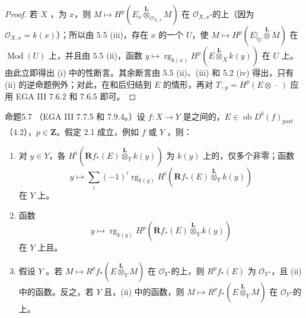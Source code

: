\begin{proof}
若 $X$ ，为 $x$，则 $M\mapsto H^p(E_x\mathbin{\overset{\mathbf L}{\otimes}}_{\mathcal O_{X,x}}M)$ 在 $\mathcal O_{X,x}$-的上（因为 $\mathcal O_{X,x}=k(x)$）；所以由 5.5 (iii)，存在 $x$ 的一个 $U$，使 $M\mapsto H^p(E|_U\mathbin{\overset{\mathbf L}{\otimes}}M)$ 在 $\operatorname{Mod}(U)$ 上，并且由 5.5 (ii)，函数
$y\mapsto\operatorname{rg}_{k(x)}H^p(E\mathbin{\overset{\mathbf L}{\otimes}}_Xk(y))$ 在 $U$ 上。由此立即得出 (i) 中的性断言。其余断言由 5.5 (ii)、(iii) 和 5.2 (iv) 得出，只有 (ii) 的逆命题例外；对此，在和后归结到 $E$ 的情形，再对 $T_{-p}=H^p(E\otimes\,\cdot\,)$ 应用 EGA III 7.6.2 和 7.6.5 即可。
\end{proof}
\begin{SGAresult}{命题}{5.7}
（EGA III 7.7.5 和 7.9.4。）设 $f:X\to Y$ 是之间的，$E\in\operatorname{ob}D^b(f)_{\underline{\mathrm{parf}}}$（4.2），$p\in\mathbf Z$。假定 2.1 成立，例如 $f$ 或 $Y$ ，则：
\begin{enumerate}
\item[(i)] 对 $y\in Y$，各 $H^i(\mathbf Rf_*(E)\mathbin{\overset{\mathbf L}{\otimes}}_Yk(y))$ 为 $k(y)$ 上的，仅多个非零；函数
\[
y\longmapsto\sum_i(-1)^i\operatorname{rg}_{k(y)}H^i(\mathbf Rf_*(E)\mathbin{\overset{\mathbf L}{\otimes}}_Yk(y))
\]
在 $Y$ 上。
\item[(ii)] 函数
\[
y\longmapsto\operatorname{rg}_{k(y)}H^p(\mathbf Rf_*(E)\mathbin{\overset{\mathbf L}{\otimes}}_Yk(y))
\]
在 $Y$ 上且。
\item[(iii)] 假设 $Y$ 。若 $M\mapsto R^pf_*(E\mathbin{\overset{\mathbf L}{\otimes}}_YM)$ 在 $\mathcal O_Y$-的上，则 $R^pf_*(E)$ 为 $\mathcal O_Y$-，且 (ii) 中的函数。反之，若 $Y$ 且，(ii) 中的函数，则 $M\mapsto R^pf_*(E\mathbin{\overset{\mathbf L}{\otimes}}_YM)$ 在 $\mathcal O_Y$-的上。
\end{enumerate}
\end{SGAresult}
